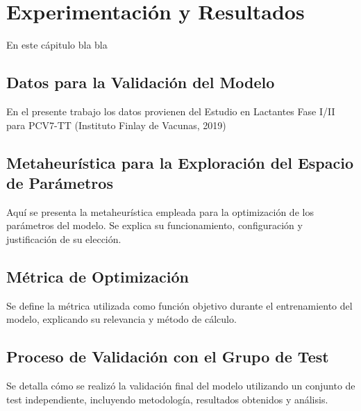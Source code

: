 \chapter{Experimentación y Resultados}\label{chapter:resultados}

En este cápitulo bla bla

\section{Datos para la Validación del Modelo}
En el presente trabajo los datos provienen del Estudio en Lactantes Fase I/II para PCV7-TT (Instituto Finlay de Vacunas, 2019) 

\section{Metaheurística para la Exploración del Espacio de Parámetros}
Aquí se presenta la metaheurística empleada para la optimización de los parámetros del modelo. Se explica su funcionamiento, configuración y justificación de su elección.


\section{Métrica de Optimización}
Se define la métrica utilizada como función objetivo durante el entrenamiento del modelo, explicando su relevancia y método de cálculo.


\section{Proceso de Validación con el Grupo de Test}
Se detalla cómo se realizó la validación final del modelo utilizando un conjunto de test independiente, incluyendo metodología, resultados obtenidos y análisis.


